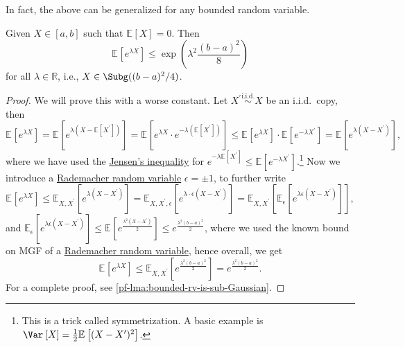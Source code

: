 In fact, the above can be generalized for any bounded random variable.

\begin{lemma}\label{lma:bounded-rv-is-sub-Gaussian}
	Given \(X\in [a, b]\) such that \(\mathbb{E}_{}\left[X \right] = 0\). Then
	\[
		\mathbb{E}_{}\left[e^{\lambda X} \right] \leq \exp (\lambda ^2 \frac{(b-a)^2}{8})
	\]
	for all \(\lambda \in \mathbb{R} \), i.e., \(X\in \Subg((b-a)^2 / 4) \).
\end{lemma}
\begin{proof}
	We will prove this with a worse constant. Let \(X^{\prime} \overset{\text{i.i.d.} }{\sim } X\) be an i.i.d.\ copy, then
	\[
		\mathbb{E}_{}\left[e^{\lambda X} \right]
		= \mathbb{E}_{}\left[e^{\lambda (X - \mathbb{E}_{}\left[X^{\prime}  \right] )} \right]
		= \mathbb{E}_{}\left[e^{\lambda X}\cdot e^{-\lambda (\mathbb{E}_{}\left[X^{\prime}  \right] )} \right]
		\leq \mathbb{E}_{}\left[e^{\lambda X} \right] \cdot \mathbb{E}_{}\left[e^{-\lambda X^{\prime} } \right]
		= \mathbb{E}_{}\left[e^{\lambda (X - X^{\prime} )} \right],
	\]
	where we have used the \href{https://en.wikipedia.org/wiki/Jensen%27s_inequality}{Jensen's inequality} for \(e^{-\lambda \mathbb{E}_{}\left[X^{\prime}  \right] } \leq \mathbb{E}_{}\left[e^{-\lambda X^{\prime} } \right] \).\footnote{This is a trick called symmetrization. A basic example is \(\Var_{}\left[X \right] = \frac{1}{2} \mathbb{E}_{}\left[(X - X^{\prime} )^2 \right] \).} Now we introduce a \hyperref[eg:Rademacher-random-varaible]{Rademacher random variable} \(\epsilon = \pm 1\), to further write
	\[
		\mathbb{E}_{}\left[e^{\lambda X} \right]
		\leq \mathbb{E}_{X, X^{\prime} }\left[e^{\lambda (X - X^{\prime} )} \right]
		= \mathbb{E}_{X, X^{\prime} , \epsilon }\left[ e^{\lambda \cdot \epsilon (X - X^{\prime} )} \right]
		= \mathbb{E}_{X, X^{\prime} }\left[ \mathbb{E}_{\epsilon }\left[e^{\lambda \epsilon (X - X^{\prime} )} \right]  \right] ,
	\]
	and \(\mathbb{E}_{\epsilon }\left[ e^{\lambda \epsilon (X - X^{\prime} )} \right] \leq \mathbb{E}_{}\left[e^{\frac{\lambda ^2(X - X^{\prime} )}{2}} \right] \leq e^{\frac{\lambda ^2(b - a)^2}{2}} \), where we used the known bound on MGF of a \hyperref[eg:Rademacher-random-varaible]{Rademacher random variable}, hence overall, we get
	\[
		\mathbb{E}_{}\left[e^{\lambda X} \right] \leq \mathbb{E}_{X, X^{\prime} }\left[e^{\frac{\lambda ^2(b-a)^2}{2}} \right] = e^{\frac{\lambda ^2(b-a)^2}{2}}.
	\]
	For a complete proof, see \autoref{pf-lma:bounded-rv-is-sub-Gaussian}.
\end{proof}

